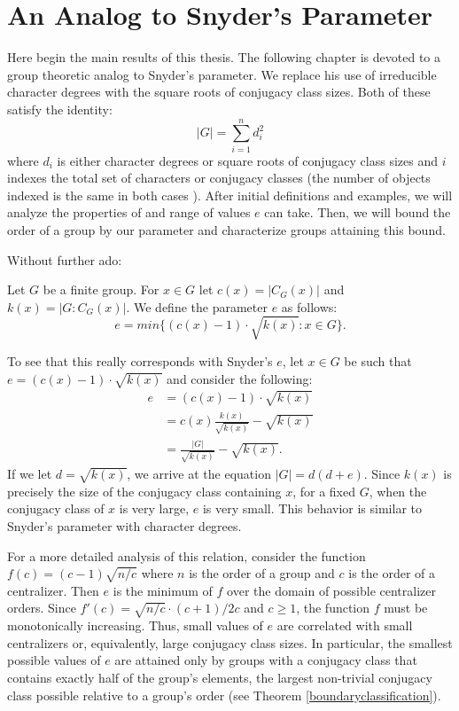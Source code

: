 \documentclass[main.tex]{subfiles}
\begin{document}
\chapter{An Analog to Snyder's Parameter}

Here begin the main results of this thesis. The following chapter is devoted to a group theoretic analog to Snyder's parameter. We replace his use of irreducible character degrees with the square roots of conjugacy class sizes. Both of these satisfy the identity:
$$|G| = \sum_{i=1}^n d_i^2$$
where $d_i$ is either character degrees or square roots of conjugacy class sizes and $i$ indexes the total set of characters or conjugacy classes (the number of objects indexed is the same in both cases \cite[p.96]{gorensteinfinitegroups}). After initial definitions and examples, we will analyze the properties of and range of values $e$ can take. Then, we will bound the order of a group by our parameter and characterize groups attaining this bound.

Without further ado:

\hss

\begin{definition}
Let $G$ be a finite group. For $x \in G$ let $c(x) = |C_G(x)|$ and $k(x) = |G : C_G(x)|$. We define the parameter $e$ as follows:
$$e = min\{(c(x) - 1) \cdot \sqrt{k(x)} : x \in G\}\text{.}$$
\end{definition}

\hss

To  see that this really corresponds with Snyder's $e$, let $x \in G$ be such that $e = (c(x) - 1) \cdot \sqrt{k(x)}$ and consider the following:
\begin{align*}
e &= (c(x) - 1) \cdot \sqrt{k(x)} \\
 &= c(x)\frac{k(x)}{\sqrt{k(x)}} - \sqrt{k(x)} \\
 &= \frac{|G|}{\sqrt{k(x)}} - \sqrt{k(x)}\text{.}
\end{align*}
If we let $d = \sqrt{k(x)}$, we arrive at the equation $|G| = d (d + e)$. Since $k(x)$ is precisely the size of the conjugacy class containing $x$, for a fixed $G$, when the conjugacy class of $x$ is very large, $e$ is very small. This behavior is similar to Snyder's parameter with character degrees. 

For a more detailed analysis of this relation, consider the function $f(c) = (c - 1) \sqrt{n/c}$ where $n$ is the order of a group and $c$ is the order of a centralizer. Then $e$ is the minimum of $f$ over the domain of possible centralizer orders. Since $f'(c) = \sqrt{n/c} \cdot (c+1) / 2c$ and $c \ge 1$, the function $f$ must be monotonically increasing. Thus, small values of $e$ are correlated with small centralizers or, equivalently, large conjugacy class sizes. In particular, the smallest possible values of $e$ are attained only by groups with a conjugacy class that contains exactly half of the group's elements, the largest non-trivial conjugacy class possible relative to a group's order (see Theorem \ref{boundaryclassification}).
\end{document}

